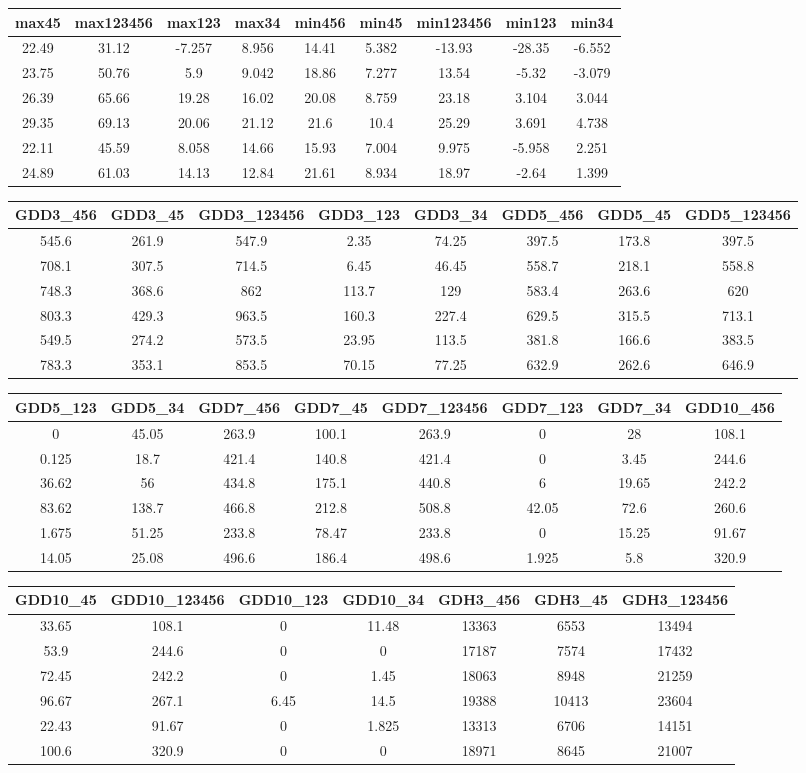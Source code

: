\documentclass[10pt,]{article}
\begin{document}
\begin{longtable}[]{@{}ccccccccc@{}}
\toprule
max45 & max123456 & max123 & max34 & min456 & min45 & min123456 & min123
& min34\tabularnewline
\midrule
\endhead
22.49 & 31.12 & -7.257 & 8.956 & 14.41 & 5.382 & -13.93 & -28.35 &
-6.552\tabularnewline
23.75 & 50.76 & 5.9 & 9.042 & 18.86 & 7.277 & 13.54 & -5.32 &
-3.079\tabularnewline
26.39 & 65.66 & 19.28 & 16.02 & 20.08 & 8.759 & 23.18 & 3.104 &
3.044\tabularnewline
29.35 & 69.13 & 20.06 & 21.12 & 21.6 & 10.4 & 25.29 & 3.691 &
4.738\tabularnewline
22.11 & 45.59 & 8.058 & 14.66 & 15.93 & 7.004 & 9.975 & -5.958 &
2.251\tabularnewline
24.89 & 61.03 & 14.13 & 12.84 & 21.61 & 8.934 & 18.97 & -2.64 &
1.399\tabularnewline
\bottomrule
\end{longtable}

\begin{longtable}[]{@{}cccccccc@{}}
\toprule
GDD3\_456 & GDD3\_45 & GDD3\_123456 & GDD3\_123 & GDD3\_34 & GDD5\_456 &
GDD5\_45 & GDD5\_123456\tabularnewline
\midrule
\endhead
545.6 & 261.9 & 547.9 & 2.35 & 74.25 & 397.5 & 173.8 &
397.5\tabularnewline
708.1 & 307.5 & 714.5 & 6.45 & 46.45 & 558.7 & 218.1 &
558.8\tabularnewline
748.3 & 368.6 & 862 & 113.7 & 129 & 583.4 & 263.6 & 620\tabularnewline
803.3 & 429.3 & 963.5 & 160.3 & 227.4 & 629.5 & 315.5 &
713.1\tabularnewline
549.5 & 274.2 & 573.5 & 23.95 & 113.5 & 381.8 & 166.6 &
383.5\tabularnewline
783.3 & 353.1 & 853.5 & 70.15 & 77.25 & 632.9 & 262.6 &
646.9\tabularnewline
\bottomrule
\end{longtable}

\begin{longtable}[]{@{}cccccccc@{}}
\toprule
GDD5\_123 & GDD5\_34 & GDD7\_456 & GDD7\_45 & GDD7\_123456 & GDD7\_123 &
GDD7\_34 & GDD10\_456\tabularnewline
\midrule
\endhead
0 & 45.05 & 263.9 & 100.1 & 263.9 & 0 & 28 & 108.1\tabularnewline
0.125 & 18.7 & 421.4 & 140.8 & 421.4 & 0 & 3.45 & 244.6\tabularnewline
36.62 & 56 & 434.8 & 175.1 & 440.8 & 6 & 19.65 & 242.2\tabularnewline
83.62 & 138.7 & 466.8 & 212.8 & 508.8 & 42.05 & 72.6 &
260.6\tabularnewline
1.675 & 51.25 & 233.8 & 78.47 & 233.8 & 0 & 15.25 & 91.67\tabularnewline
14.05 & 25.08 & 496.6 & 186.4 & 498.6 & 1.925 & 5.8 &
320.9\tabularnewline
\bottomrule
\end{longtable}

\begin{longtable}[]{@{}ccccccc@{}}
\toprule
GDD10\_45 & GDD10\_123456 & GDD10\_123 & GDD10\_34 & GDH3\_456 &
GDH3\_45 & GDH3\_123456\tabularnewline
\midrule
\endhead
33.65 & 108.1 & 0 & 11.48 & 13363 & 6553 & 13494\tabularnewline
53.9 & 244.6 & 0 & 0 & 17187 & 7574 & 17432\tabularnewline
72.45 & 242.2 & 0 & 1.45 & 18063 & 8948 & 21259\tabularnewline
96.67 & 267.1 & 6.45 & 14.5 & 19388 & 10413 & 23604\tabularnewline
22.43 & 91.67 & 0 & 1.825 & 13313 & 6706 & 14151\tabularnewline
100.6 & 320.9 & 0 & 0 & 18971 & 8645 & 21007\tabularnewline
\bottomrule
\end{longtable}
\end{document}
